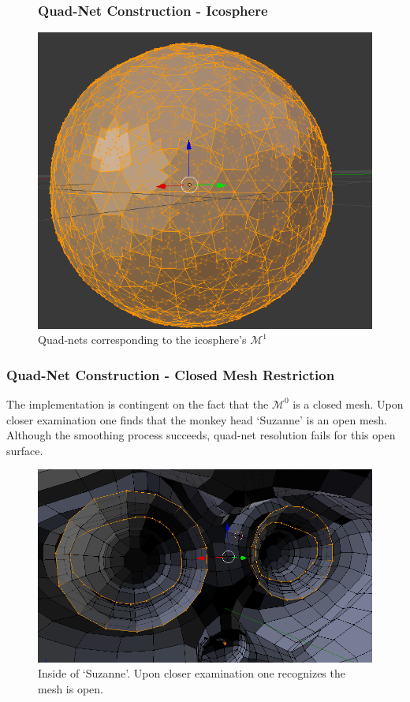 \documentclass[11pt]{beamer}
\begin{document}
	\begin{frame}
		\begin{figure}[h]
			\frametitle{Quad-Net Construction - Icosphere}
			\centering
			\includegraphics[width=.75\linewidth]{img/quad_icosphere_2}
			\caption{Quad-nets corresponding to the icosphere's $\mathcal{M}^1$ }	
		\end{figure}
	\end{frame}

	\begin{frame}
		\frametitle{Quad-Net Construction - Closed Mesh Restriction}
		The implementation is contingent on the fact that the $\mathcal{M}^0$ is a closed mesh. Upon closer examination one finds that the monkey head `Suzanne' is an open mesh. Although the smoothing process succeeds, quad-net resolution fails for this open surface. \\
		\begin{figure}[h]
			\centering
			\includegraphics[width=.5\linewidth]{img/quad_monkey}
			\caption{Inside of `Suzanne'. Upon closer examination one recognizes the mesh is open.}	
		\end{figure}
	\end{frame}
	
\end{document}
